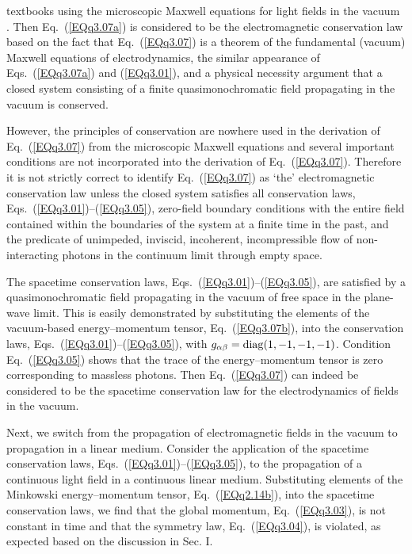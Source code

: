 \documentclass[twocolumn,amssymb,eqsecnum,aps,pra]{revtex4-2}
\begin{document}
textbooks using the microscopic Maxwell equations for light fields
in the vacuum \cite{BIGriff}.
Then Eq.~(\ref{EQq3.07a}) is considered to be the electromagnetic
conservation law based on the fact that Eq.~(\ref{EQq3.07}) is a
theorem of the fundamental (vacuum) Maxwell equations of
electrodynamics, the similar appearance of Eqs.~(\ref{EQq3.07a})
and (\ref{EQq3.01}), and a physical necessity argument that a
closed system consisting of a finite quasimonochromatic field
propagating in the vacuum is conserved.
\par
However, the principles of conservation are nowhere used in the
derivation of Eq.~(\ref{EQq3.07}) from the microscopic Maxwell
equations and several important conditions are not incorporated
into the derivation of Eq.~(\ref{EQq3.07}).
Therefore it is not strictly correct to identify Eq.~(\ref{EQq3.07})
as `the' electromagnetic conservation law unless the closed system
satisfies all conservation laws, Eqs.~(\ref{EQq3.01})--(\ref{EQq3.05}),
zero-field boundary conditions with the entire field contained within
the boundaries of the system at a finite time in the past, and the
predicate of unimpeded, inviscid, incoherent, incompressible flow of
non-interacting photons in the continuum limit through empty space.
\par
The spacetime conservation laws, Eqs.~(\ref{EQq3.01})--(\ref{EQq3.05}),
are satisfied by a quasimonochromatic field propagating in the 
vacuum of free space in the plane-wave limit.
This is easily demonstrated by substituting the elements of the 
vacuum-based energy--momentum tensor, Eq.~(\ref{EQq3.07b}),
into the conservation laws, Eqs.~(\ref{EQq3.01})--(\ref{EQq3.05}),
with $g_{\alpha\beta}= {\rm diag}(1,-1,-1,-1)$.
Condition Eq.~(\ref{EQq3.05}) shows that the trace of the
energy--momentum tensor is zero corresponding to massless photons.
Then Eq.~(\ref{EQq3.07}) can indeed be considered to be the 
spacetime conservation law for the electrodynamics of fields
in the vacuum.
\par
Next, we switch from the propagation of electromagnetic fields
in the vacuum to propagation in a linear medium.
Consider the application of the spacetime conservation laws,
Eqs.~(\ref{EQq3.01})--(\ref{EQq3.05}),
to the propagation of a continuous light field in a continuous
linear medium.
Substituting elements of the Minkowski energy--momentum tensor,
Eq.~(\ref{EQq2.14b}), into the spacetime conservation laws, we
find that the global momentum, Eq.~(\ref{EQq3.03}), is not
constant in time and that the symmetry law, Eq.~(\ref{EQq3.04}),
is violated, as expected based on the discussion in Sec. I.
\end{document}
